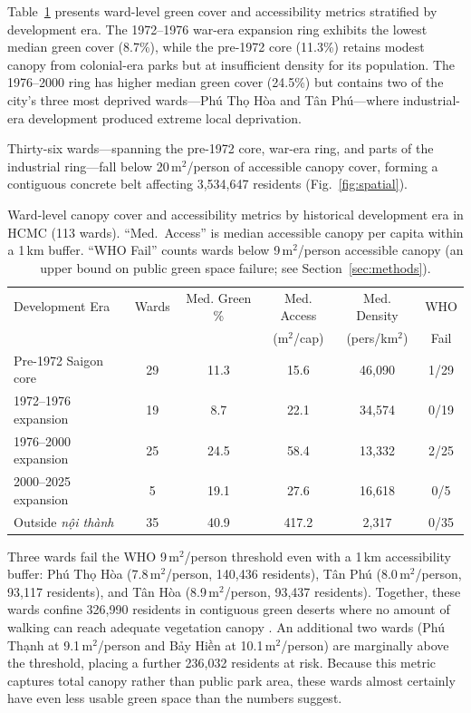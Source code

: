 \documentclass[preprint,12pt]{elsarticle}
\begin{document}
Table~\ref{tab:rings} presents ward-level green cover and accessibility metrics stratified by development era. The 1972--1976 war-era expansion ring exhibits the lowest median green cover (8.7\%), while the pre-1972 core (11.3\%) retains modest canopy from colonial-era parks but at insufficient density for its population. The 1976--2000 ring has higher median green cover (24.5\%) but contains two of the city's three most deprived wards---Phú Thọ Hòa and Tân Phú---where industrial-era development produced extreme local deprivation.

Thirty-six wards---spanning the pre-1972 core, war-era ring, and parts of the industrial ring---fall below 20\,m$^2$/person of accessible canopy cover, forming a contiguous concrete belt affecting 3,534,647 residents (Fig.~\ref{fig:spatial}).

\begin{table}[htbp]
\centering
\caption{Ward-level canopy cover and accessibility metrics by historical development era in HCMC (113 wards). ``Med.\ Access'' is median accessible canopy per capita within a 1\,km buffer. ``WHO Fail'' counts wards below 9\,m$^2$/person accessible canopy (an upper bound on public green space failure; see Section~\ref{sec:methods}).}
\label{tab:rings}
\begin{tabular}{lccccc}
\toprule
Development Era & Wards & Med. Green \% & Med. Access & Med. Density & WHO \\
 & & & (m$^2$/cap) & (pers/km$^2$) & Fail \\
\midrule
Pre-1972 Saigon core       & 29 & 11.3 & 15.6  & 46{,}090 & 1/29 \\
1972--1976 expansion        & 19 &  8.7 & 22.1  & 34{,}574 & 0/19 \\
1976--2000 expansion        & 25 & 24.5 & 58.4  & 13{,}332 & 2/25 \\
2000--2025 expansion        &  5 & 19.1 & 27.6  & 16{,}618 & 0/5  \\
Outside \textit{nội thành}  & 35 & 40.9 & 417.2 &  2{,}317 & 0/35 \\
\bottomrule
\end{tabular}
\end{table}

Three wards fail the WHO 9\,m$^2$/person threshold even with a 1\,km accessibility buffer: Phú Thọ Hòa (7.8\,m$^2$/person, 140,436 residents), Tân Phú (8.0\,m$^2$/person, 93,117 residents), and Tân Hòa (8.9\,m$^2$/person, 93,437 residents). Together, these wards confine 326,990 residents in contiguous green deserts where no amount of walking can reach adequate vegetation canopy \citep{gso2024}. An additional two wards (Phú Thạnh at 9.1\,m$^2$/person and Bảy Hiền at 10.1\,m$^2$/person) are marginally above the threshold, placing a further 236,032 residents at risk. Because this metric captures total canopy rather than public park area, these wards almost certainly have even less usable green space than the numbers suggest.
\end{document}
